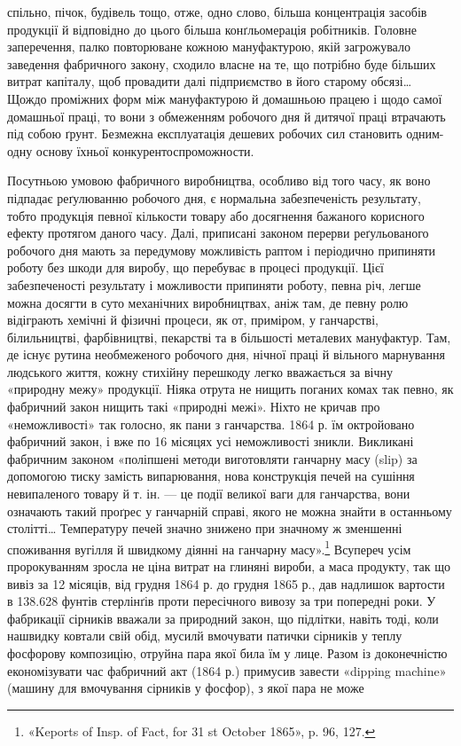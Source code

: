 \parcont{}  %
спільно, пічок, будівель тощо, отже, одно слово, більша концентрація
засобів продукції й відповідно до цього більша конґльомерація
робітників. Головне заперечення, палко повторюване
кожною мануфактурою, якій загрожувало заведення фабричного
закону, сходило власне на те, що потрібно буде більших витрат
капіталу, щоб провадити далі підприємство в його старому обсязі\dots{}
Щождо проміжних форм між мануфактурою й домашньою працею
і щодо самої домашньої праці, то вони з обмеженням робочого
дня й дитячої праці втрачають під собою ґрунт. Безмежна експлуатація
дешевих робочих сил становить одним-одну основу їхньої
конкурентоспроможности.

Посутньою умовою фабричного виробництва, особливо від того
часу, як воно підпадає реґулюванню робочого дня, є нормальна
забезпеченість результату, тобто продукція певної кількости товару
або досягнення бажаного корисного ефекту протягом даного
часу. Далі, приписані законом перерви реґульованого робочого
дня мають за передумову можливість раптом і періодично припиняти
роботу без шкоди для виробу, що перебуває в процесі продукції.
Цієї забезпеченості результату і можливости припиняти
роботу, певна річ, легше можна досягти в суто механічних виробництвах,
аніж там, де певну ролю відіграють хемічні й фізичні
процеси, як от, приміром, у ганчарстві, білильництві, фарбівництві,
пекарстві та в більшості металевих мануфактур. Там, де
існує рутина необмеженого робочого дня, нічної праці й вільного
марнування людського життя, кожну стихійну перешкоду легко
вважається за вічну «природну межу» продукції. Ніяка отрута
не нищить поганих комах так певно, як фабричний закон нищить
такі «природні межі». Ніхто не кричав про «неможливості» так
голосно, як пани з ганчарства. 1864 р. їм октройовано фабричний
закон, і вже по 16 місяцях усі неможливості зникли. Викликані
фабричним законом «поліпшені методи виготовляти ганчарну
масу (slip) за допомогою тиску замість випарювання, нова конструкція
печей на сушіння невипаленого товару й т. ін. — це
події великої ваги для ганчарства, вони означають такий проґрес
у ганчарній справі, якого не можна знайти в останньому столітті\dots{}
Температуру печей значно знижено при значному ж зменшенні
споживання вугілля й швидкому діянні на ганчарну масу».\footnote{
«Keports of Insp. of Fact, for 31 st October 1865», p. 96, 127.
}
Всупереч усім пророкуванням зросла не ціна витрат на глиняні
вироби, а маса продукту, так що вивіз за 12 місяців, від грудня
1864 р. до грудня 1865 р., дав надлишок вартости в 138.628 фунтів
стерлінґів проти пересічного вивозу за три попередні роки. У фабрикації
сірників вважали за природний закон, що підлітки,
навіть тоді, коли нашвидку ковтали свій обід, мусилй вмочувати
патички сірників у теплу фосфорову композицію, отруйна пара
якої била їм у лице. Разом із доконечністю економізувати час
фабричний акт (1864 р.) примусив завести «dipping machine»
(машину для вмочування сірників у фосфор), з якої пара не може
\parbreak{}  %
